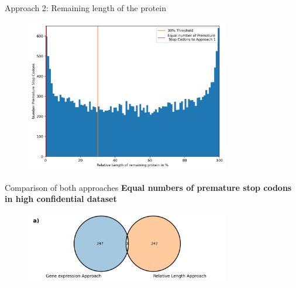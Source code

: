 \documentclass{beamer}
\begin{document}
\begin{frame}{Approach 2: Remaining length of the protein}
	\begin{figure}[tb]
		\centering
		\begin{minipage}[h]{1\textwidth}
		\centering
		\includegraphics[width=0.8\textwidth]{images/Remaining_Length.png}
		\label{fig:Remaining_Length}
		\end{minipage}
	\end{figure}
\end{frame}
\begin{frame}{Comparison of both approaches}
	\textbf{Equal numbers of premature stop codons in high confidential dataset}
	
	\vspace{3mm}

	\begin{figure}[tb]
		\centering
		\begin{minipage}[h]{1\textwidth}
		\centering
		\includegraphics[width=0.8\textwidth]{images/Venn_Diagramm_small.png}
		\label{fig:Venn_Diagramm_small}
		\end{minipage}
	\end{figure}
\end{frame}
\end{document}
